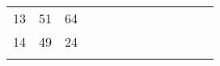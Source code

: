 \begin{table}[tb]
\begin{tabular}{ccccccccccccc}
		\multicolumn{1}{|c|}{13} & \multicolumn{1}{c|}{51} & \multicolumn{1}{c|}{64} &                         &                         &                         &                         &                         &                         &                         &                         &                         &                         \\ \cline{1-3}
		\multicolumn{1}{|c|}{14} & \multicolumn{1}{c|}{49} & \multicolumn{1}{c|}{24} &                         &                         &                         &                         &                         &                         &                         &                         &                         &                         \\ \cline{1-3}
		\multicolumn{1}{l}{}     & \multicolumn{1}{l}{}    & \multicolumn{1}{l}{}    & \multicolumn{1}{l}{}    & \multicolumn{1}{l}{}    & \multicolumn{1}{l}{}    & \multicolumn{1}{l}{}    & \multicolumn{1}{l}{}    & \multicolumn{1}{l}{}    & \multicolumn{1}{l}{}    & \multicolumn{1}{l}{}    & \multicolumn{1}{l}{}    & \multicolumn{1}{l}{}   
	\end{tabular}
	
	
\end{table}


